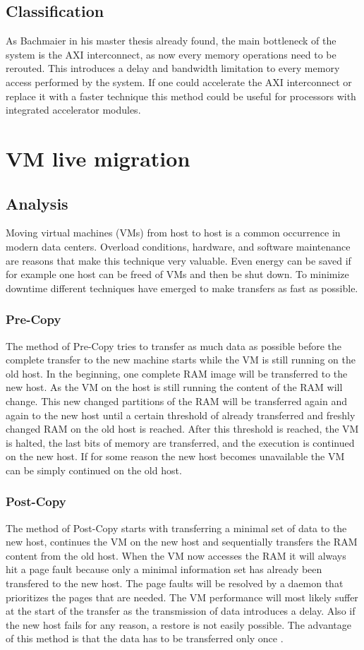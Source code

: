 \subsection{Classification}
As Bachmaier in his master thesis already found, the main bottleneck
of the system is the AXI interconnect, as now every memory operations
need to be rerouted. This introduces a delay and bandwidth limitation
to every memory access performed by the system. If one could accelerate
the AXI interconnect or replace it with a faster technique this method
could be useful for processors with integrated accelerator modules.

\section{VM live migration}
\subsection{Analysis}
Moving virtual machines (VMs) from host to host is a common occurrence
in modern data centers. Overload conditions, hardware, and software
maintenance are reasons that make this technique very valuable.
Even energy can be saved if for example one host can be freed of
VMs and then be shut down.
To minimize downtime different techniques
have emerged to make transfers as fast as possible.

\subsubsection{Pre-Copy}
The method of Pre-Copy tries to transfer as much data as possible
before the complete transfer to the new machine
starts while the VM is still running
on the old host. In the beginning, one complete RAM image will be transferred
to the new host. As the VM on the host is still running the content
of the RAM will change. This new changed partitions of the RAM will
be transferred again and again to the new host until a certain threshold of
already transferred and freshly changed RAM on the old host is reached.
After this threshold is reached, the VM is halted, the last bits of
memory are transferred, and the execution is continued on the new host.
If for some reason the new host becomes unavailable the VM can be
simply continued on the old host. \cite{Sharma2016}

\subsubsection{Post-Copy}
The method of Post-Copy starts with transferring a minimal set of data
to the new host, continues the VM on the new host and sequentially
transfers the RAM content from the old host. When the
VM now accesses the RAM it will always hit a page fault because
only a minimal information set has already been transfered to the new host.
The page faults
will be resolved by a daemon that prioritizes the pages that are needed.
The VM performance will most likely suffer at the start of the transfer
as the transmission of data introduces a delay. Also if the new host fails
for any reason, a restore is not easily possible.
The advantage of this method is that the data has to be transferred only
once \cite{sh_hu_pre-post-copy}.

